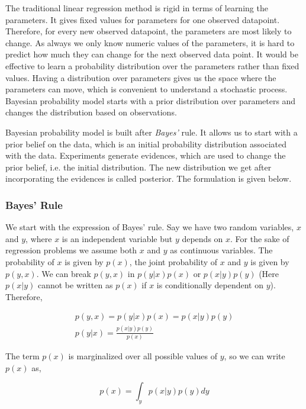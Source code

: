 \documentclass[english]{tktltiki}
\begin{document}
The traditional linear regression method is rigid in terms of learning the parameters. It gives fixed values for parameters for one observed datapoint. Therefore, for every new observed datapoint, the parameters are most likely to change. As always we only know numeric values of the parameters, it is hard to predict how much they can change for the next observed data point.  It would be effective to learn a probability distribution over the parameters rather than fixed values. Having a distribution over parameters gives us the space where the parameters can move, which is convenient to understand a stochastic process. Bayesian probability model starts with a prior distribution over parameters and changes the distribution based on observations.

Bayesian probability model is built after \textit{Bayes'} rule. It allows us to start with a prior belief on the data, which is an initial probability distribution associated with the data. Experiments generate evidences, which are used to change the prior belief, i.e. the initial distribution. The new distribution we get after incorporating the evidences is called posterior. The formulation is given below.

\subsubsection{Bayes' Rule}

We start with the expression of Bayes' rule. Say we have two random variables, $x$ and $y$, where $x$ is an independent variable but $y$ depends on $x$. For the sake of regression problems we assume both $x$ and $y$ as continuous variables. The probability of $x$ is given by $p(x)$, the joint probability of $x$ and $y$ is given by $p(y, x)$. We can break $p(y, x)$ in $p(y|x)p(x)$ or $p(x|y)p(y)$ (Here $p(x|y)$ cannot be written as $p(x)$ if $x$ is conditionally dependent on $y$). Therefore,

\begin{eqnarray}
p(y, x) = p(y|x)p(x) = p(x|y)p(y)\nonumber\\
p(y|x) = \frac{p(x|y)p(y)}{p(x)}
\end{eqnarray}


The term $p(x)$ is marginalized over all possible values of $y$, so we can write $p(x)$ as,

\begin{equation}
p(x) = \int_y{p(x|y)p(y)dy}
\end{equation}
\end{document}
